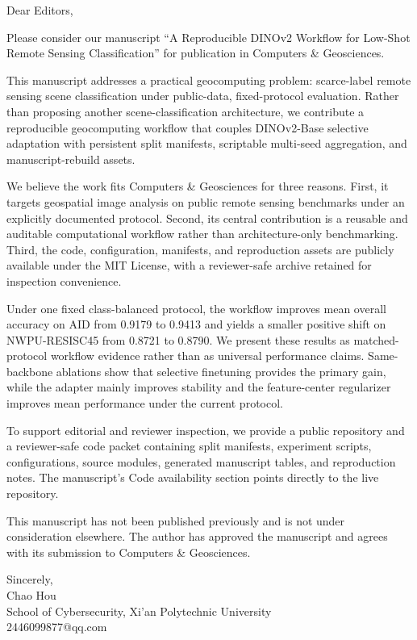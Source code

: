 \documentclass[a4paper,fleqn]{cas-sc}
\begin{document}
\begin{coverletter}
\raggedright
Dear Editors,

Please consider our manuscript ``A Reproducible DINOv2 Workflow for Low-Shot Remote Sensing Classification'' for publication in Computers \& Geosciences.

This manuscript addresses a practical geocomputing problem: scarce-label remote sensing scene classification under public-data, fixed-protocol evaluation. Rather than proposing another scene-classification architecture, we contribute a reproducible geocomputing workflow that couples DINOv2-Base selective adaptation with persistent split manifests, scriptable multi-seed aggregation, and manuscript-rebuild assets.

We believe the work fits Computers \& Geosciences for three reasons. First, it targets geospatial image analysis on public remote sensing benchmarks under an explicitly documented protocol. Second, its central contribution is a reusable and auditable computational workflow rather than architecture-only benchmarking. Third, the code, configuration, manifests, and reproduction assets are publicly available under the MIT License, with a reviewer-safe archive retained for inspection convenience.

Under one fixed class-balanced protocol, the workflow improves mean overall accuracy on AID from 0.9179 to 0.9413 and yields a smaller positive shift on NWPU-RESISC45 from 0.8721 to 0.8790. We present these results as matched-protocol workflow evidence rather than as universal performance claims. Same-backbone ablations show that selective finetuning provides the primary gain, while the adapter mainly improves stability and the feature-center regularizer improves mean performance under the current protocol.

To support editorial and reviewer inspection, we provide a public repository and a reviewer-safe code packet containing split manifests, experiment scripts, configurations, source modules, generated manuscript tables, and reproduction notes. The manuscript's Code availability section points directly to the live repository.

This manuscript has not been published previously and is not under consideration elsewhere. The author has approved the manuscript and agrees with its submission to Computers \& Geosciences.

Sincerely,\\
Chao Hou\\
School of Cybersecurity, Xi'an Polytechnic University\\
2446099877@qq.com
\end{coverletter}
\end{document}
